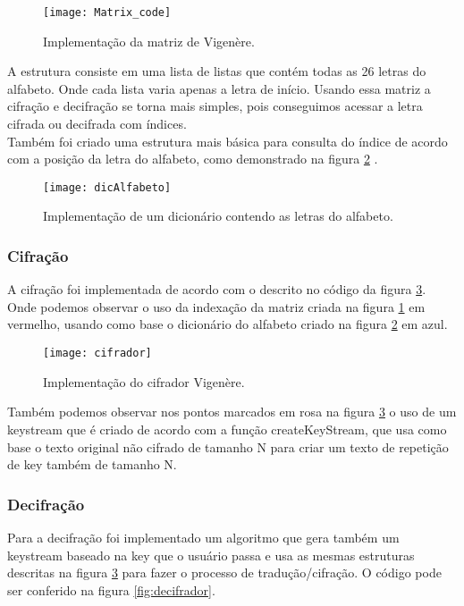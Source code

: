 \documentclass[10pt]{article}
\begin{document}
\begin{figure}[h]
    \texttt{[image: Matrix\_code]}
    \centering
    \caption{Implementação da matriz de Vigenère.}
    \label{fig:matriz_code}
  \end{figure}

A estrutura consiste em uma lista de listas que contém todas as 26 letras do alfabeto. Onde cada lista varia apenas a letra de início.
Usando essa matriz a cifração e decifração se torna mais simples, pois conseguimos acessar a letra cifrada ou decifrada com índices.\\
Também foi criado uma estrutura mais básica para consulta do índice de acordo com a posição da letra do alfabeto, como demonstrado na figura 
\ref{fig:alfabeto_code} .

\begin{figure}[h]
  \texttt{[image: dicAlfabeto]}
  \centering
  \caption{Implementação de um dicionário contendo as letras do alfabeto.}
  \label{fig:alfabeto_code}
\end{figure}

\newpage
\subsubsection{Cifração}
A cifração foi implementada de acordo com o descrito no código da figura \ref{fig:cifrador}.
Onde podemos observar o uso da indexação da matriz criada na figura \ref{fig:matriz_code} em vermelho, usando como base o dicionário
do alfabeto criado na figura \ref{fig:alfabeto_code} em azul.


\begin{figure}[h]
  \texttt{[image: cifrador]}
  \centering
  \caption{Implementação do cifrador Vigenère.}
  \label{fig:cifrador}
\end{figure}
Também podemos observar nos pontos marcados em rosa na figura \ref{fig:cifrador} o uso de um keystream que é criado de acordo com a função
createKeyStream, que usa como base o texto original não cifrado de tamanho N para criar um texto de repetição de key também de tamanho N.
\subsubsection{Decifração}
Para a decifração foi implementado um algoritmo que gera também um keystream baseado na key que o usuário passa e usa as mesmas estruturas
descritas na figura \ref{fig:cifrador} para fazer o processo de tradução/cifração. O código pode ser conferido na figura \ref{fig:decifrador}.
\end{document}
